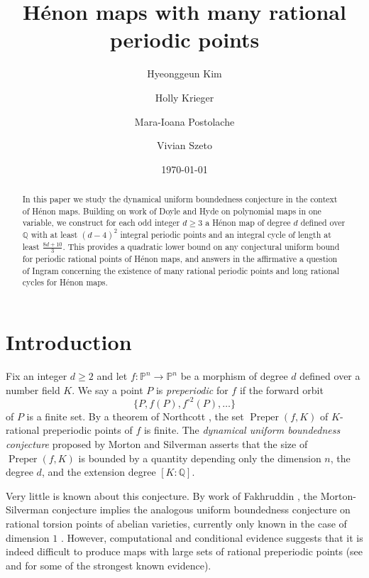 \documentclass[12pt]{amsart}
\DeclareMathOperator{\preper}{Preper}
\theoremstyle{definition}
\begin{document}
\title{H\'enon maps with many rational periodic points}
\author[Kim]{Hyeonggeun Kim}
\author[Krieger]{Holly Krieger}
\author[Postolache]{Mara-Ioana Postolache}
\author[Szeto]{Vivian Szeto}
\date{\today}

\begin{abstract}
    In this paper we study the dynamical uniform boundedness conjecture in the context of H\'enon maps.  Building on work of Doyle and Hyde on polynomial maps in one variable, we construct for each odd integer $d \geq 3$ a H\'enon map of degree $d$ defined over $\mathbb{Q}$ with at least $(d-4)^2$ integral periodic points and an integral cycle of length at least $\frac{8d+10}{3}$.   This provides a quadratic lower bound on any conjectural uniform bound for periodic rational points of H\'enon maps, and answers in the affirmative a question of Ingram concerning the existence of many rational periodic points and long rational cycles for H\'enon maps.  
    
    
    
    \end{abstract}

\maketitle

\section{Introduction}

Fix an integer $d \geq 2$ and let $f: \mathbb{P}^n \rightarrow \mathbb{P}^n$ be a morphism of degree $d$ defined over a number field $K$.  We say a point $P$ is \emph{preperiodic} for $f$ if the forward orbit 
$$\{ P, f(P), f^{\circ 2}(P), \dots \}$$
of $P$ is a finite set. By a theorem of Northcott \cite{northcott}, the set $\preper(f,K)$ of $K$-rational preperiodic points of $f$ is finite. The \emph{dynamical uniform boundedness conjecture} proposed by Morton and Silverman \cite{Morton1994RationalPP} asserts that the size of $\preper(f,K)$ is bounded by a quantity depending only the dimension $n$, the degree $d$, and the extension degree $[K:\mathbb{Q}]$. 

Very little is known about this conjecture. By work of Fakhruddin \cite{fakhruddin}, the Morton-Silverman conjecture implies the analogous uniform boundedness conjecture on rational torsion points of abelian varieties, currently only known in the case of dimension $1$ \cite{mazur_1, merel}.  However, computational and conditional evidence suggests that it is indeed difficult to produce maps with large sets of rational preperiodic points (see \cite{Benedetto} and \cite{looper_dynamicallang} for some of the strongest known evidence).
\end{document}

